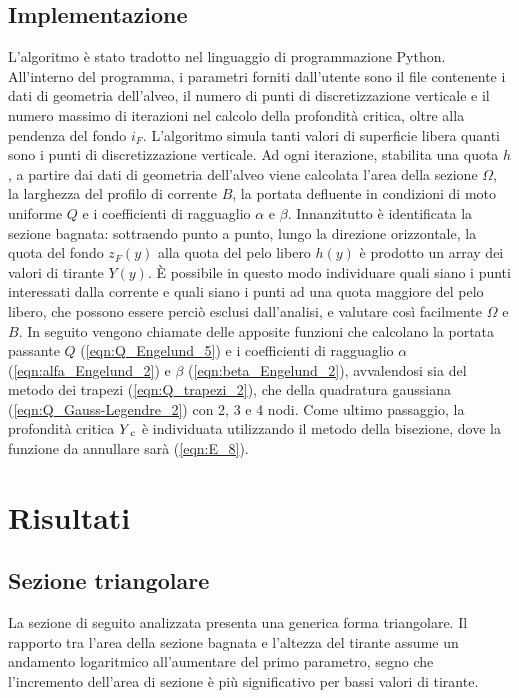 \documentclass[12pt]{article} %
\begin{document}
\subsection{Implementazione}

\noindent L’algoritmo è stato tradotto nel linguaggio di programmazione Python. All’interno del programma, i parametri forniti dall’utente sono il file contenente i dati di geometria dell’alveo, il numero di punti di discretizzazione verticale e il numero massimo di iterazioni nel calcolo della profondità critica, oltre alla pendenza del fondo $i_F$.
L'algoritmo simula tanti valori di superficie libera quanti sono i punti di discretizzazione verticale. Ad ogni iterazione, stabilita una quota $h$, a partire dai dati di geometria dell’alveo viene calcolata l’area della sezione $\Omega$, la larghezza del profilo di corrente $B$, la portata defluente in condizioni di moto uniforme $Q$ e i coefficienti di ragguaglio $\alpha$ e $\beta$. 
Innanzitutto è identificata la sezione bagnata: sottraendo punto a punto, lungo la direzione orizzontale, la quota del fondo $z_F(y)$ alla quota del pelo libero $h(y)$ è prodotto un array dei valori di tirante $Y(y)$. È possibile in questo modo individuare quali siano i punti interessati dalla corrente e quali siano i punti ad una quota maggiore del pelo libero, che possono essere perciò esclusi dall’analisi, e valutare così facilmente $\Omega$ e $B$. In seguito vengono chiamate delle apposite funzioni che calcolano la portata passante $Q$ (\ref{eqn:Q_Engelund_5}) e i coefficienti di ragguaglio $\alpha$ (\ref{eqn:alfa_Engelund_2}) e $\beta$ (\ref{eqn:beta_Engelund_2}), avvalendosi sia del metodo dei trapezi (\ref{eqn:Q_trapezi_2}), che della quadratura gaussiana (\ref{eqn:Q_Gauss-Legendre_2}) con 2, 3 e 4 nodi. 
Come ultimo passaggio, la profondità critica $Y\textsubscript{c}$ è individuata utilizzando il metodo della bisezione, dove la funzione da annullare sarà (\ref{eqn:E_8}).

\newpage

\section{Risultati}
\subsection{Sezione triangolare}

\noindent La sezione di seguito analizzata presenta una generica forma triangolare.
Il rapporto tra l’area della sezione bagnata e l’altezza del tirante assume un andamento logaritmico all’aumentare del primo parametro, segno che l’incremento dell’area di sezione è più significativo per bassi valori di tirante.
\end{document}
